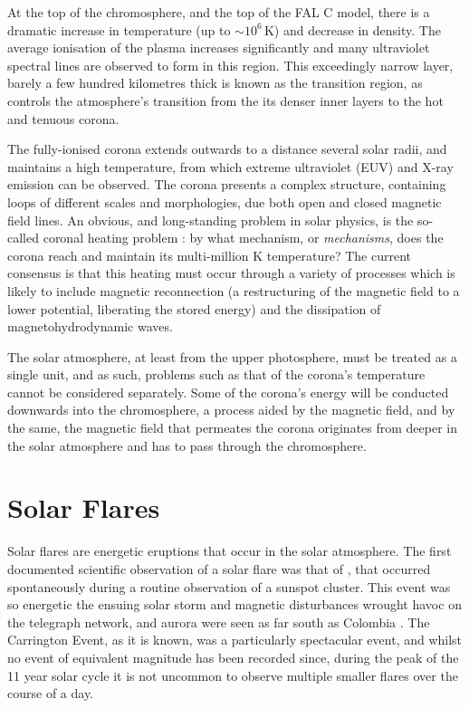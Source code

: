 At the top of the chromosphere, and the top of the FAL C model, there is a dramatic increase in temperature (up to $\sim 10^6\,\si{\kelvin}$) and decrease in density.
The average ionisation of the plasma increases significantly and many ultraviolet spectral lines are observed to form in this region.
This exceedingly narrow layer, barely a few hundred kilometres thick is known as the transition region, as controls the atmosphere's transition from the its denser inner layers to the hot and tenuous corona.

The fully-ionised corona extends outwards to a distance several solar radii, and maintains a high temperature, from which extreme ultraviolet (EUV) and X-ray emission can be observed.
The corona presents a complex structure, containing loops of different scales and morphologies, due both open and closed magnetic field lines.
An obvious, and long-standing problem in solar physics, is the so-called coronal heating problem \citep[reviewed by ][]{Klimchuk2006}: by what mechanism, or \emph{mechanisms}, does the corona reach and maintain its multi-million \si{\kelvin} temperature?
The current consensus \citep[][ and references therein]{DeMoortel2015} is that this heating must occur through a variety of processes which is likely to include magnetic reconnection (a restructuring of the magnetic field to a lower potential, liberating the stored energy) and the dissipation of magnetohydrodynamic waves.

The solar atmosphere, at least from the upper photosphere, must be treated as a single unit, and as such, problems such as that of the corona's temperature cannot be considered separately.
Some of the corona's energy will be conducted downwards into the chromosphere, a process aided by the magnetic field, and by the same, the magnetic field that permeates the corona originates from deeper in the solar atmosphere and has to pass through the chromosphere.

\section{Solar Flares}

Solar flares are energetic eruptions that occur in the solar atmosphere.
The first documented scientific observation of a solar flare was that of \citet{Carrington1859}, that occurred spontaneously during a routine observation of a sunspot cluster.
This event was so energetic the ensuing solar storm and magnetic disturbances wrought havoc on the telegraph network, and aurora were seen as far south as Colombia \citep{MorenoCardenas2016}.
The Carrington Event, as it is known, was a particularly spectacular event, and whilst no event of equivalent magnitude has been recorded since, during the peak of the 11 year solar cycle it is not uncommon to observe multiple smaller flares over the course of a day.

